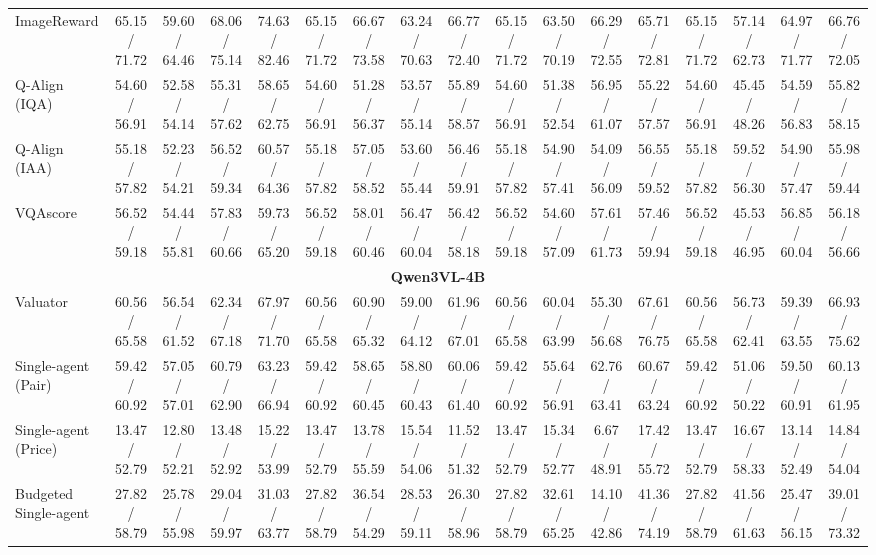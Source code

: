\begin{table}[!t]
{\begin{tabular}{lcccccccccccccccc}
ImageReward                  & 65.15 / 71.72 & 59.60 / 64.46 & 68.06 / 75.14 & 74.63 / 82.46 & 65.15 / 71.72 & 66.67 / 73.58 & 63.24 / 70.63 & 66.77 / 72.40 & 65.15 / 71.72 & 63.50 / 70.19 & 66.29 / 72.55 & 65.71 / 72.81 & 65.15 / 71.72 & 57.14 / 62.73 & 64.97 / 71.77 & 66.76 / 72.05 \\
Q-Align (IQA)                & 54.60 / 56.91 & 52.58 / 54.14 & 55.31 / 57.62 & 58.65 / 62.75 & 54.60 / 56.91 & 51.28 / 56.37 & 53.57 / 55.14 & 55.89 / 58.57 & 54.60 / 56.91 & 51.38 / 52.54 & 56.95 / 61.07 & 55.22 / 57.57 & 54.60 / 56.91 & 45.45 / 48.26 & 54.59 / 56.83 & 55.82 / 58.15 \\
Q-Align (IAA)                & 55.18 / 57.82 & 52.23 / 54.21 & 56.52 / 59.34 & 60.57 / 64.36 & 55.18 / 57.82 & 57.05 / 58.52 & 53.60 / 55.44 & 56.46 / 59.91 & 55.18 / 57.82 & 54.90 / 57.41 & 54.09 / 56.09 & 56.55 / 59.52 & 55.18 / 57.82 & 59.52 / 56.30 & 54.90 / 57.47 & 55.98 / 59.44 \\
VQAscore                     & 56.52 / 59.18 & 54.44 / 55.81 & 57.83 / 60.66 & 59.73 / 65.20 & 56.52 / 59.18 & 58.01 / 60.46 & 56.47 / 60.04 & 56.42 / 58.18 & 56.52 / 59.18 & 54.60 / 57.09 & 57.61 / 61.73 & 57.46 / 59.94 & 56.52 / 59.18 & 45.53 / 46.95 & 56.85 / 60.04 & 56.18 / 56.66 \\
\midrule
\multicolumn{17}{c}{\textbf{Qwen3VL-4B}} \\
\midrule
Valuator                     & 60.56 / 65.58 & 56.54 / 61.52 & 62.34 / 67.18 & 67.97 / 71.70 & 60.56 / 65.58 & 60.90 / 65.32 & 59.00 / 64.12 & 61.96 / 67.01 & 60.56 / 65.58 & 60.04 / 63.99 & 55.30 / 56.68 & 67.61 / 76.75 & 60.56 / 65.58 & 56.73 / 62.41 & 59.39 / 63.55 & 66.93 / 75.62 \\
Single-agent (Pair)          & 59.42 / 60.92 & 57.05 / 57.01 & 60.79 / 62.90 & 63.23 / 66.94 & 59.42 / 60.92 & 58.65 / 60.45 & 58.80 / 60.43 & 60.06 / 61.40 & 59.42 / 60.92 & 55.64 / 56.91 & 62.76 / 63.41 & 60.67 / 63.24 & 59.42 / 60.92 & 51.06 / 50.22 & 59.50 / 60.91 & 60.13 / 61.95 \\
Single-agent (Price)         & 13.47 / 52.79 & 12.80 / 52.21 & 13.48 / 52.92 & 15.22 / 53.99 & 13.47 / 52.79 & 13.78 / 55.59 & 15.54 / 54.06 & 11.52 / 51.32 & 13.47 / 52.79 & 15.34 / 52.77 & 6.67 / 48.91 & 17.42 / 55.72 & 13.47 / 52.79 & 16.67 / 58.33 & 13.14 / 52.49 & 14.84 / 54.04 \\
Budgeted Single-agent        & 27.82 / 58.79 & 25.78 / 55.98 & 29.04 / 59.97 & 31.03 / 63.77 & 27.82 / 58.79 & 36.54 / 54.29 & 28.53 / 59.11 & 26.30 / 58.96 & 27.82 / 58.79 & 32.61 / 65.25 & 14.10 / 42.86 & 41.36 / 74.19 & 27.82 / 58.79 & 41.56 / 61.63 & 25.47 / 56.15 & 39.01 / 73.32 \\

\end{tabular}}
\end{table}
